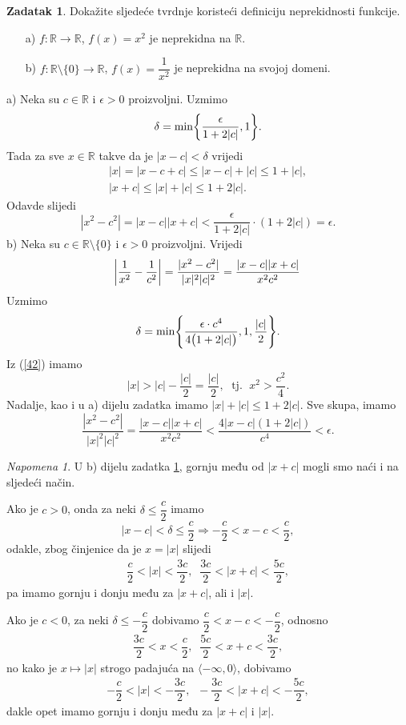 \documentclass{book}
\let\originalleft\left
\let\originalright\right
\renewcommand{\left}{\mathopen{}\mathclose\bgroup\originalleft}
\renewcommand{\right}{\aftergroup\egroup\originalright}
\renewenvironment{proof}{%
    \vspace{-\parskip}\begin{oldproof}%
    }{%
    \end{oldproof}%
}
\theoremstyle{definition}
\theoremstyle{definition}
\newtheorem{exercise}{Zadatak}
\theoremstyle{remark}
\newtheorem{remark}{Napomena}
\begin{document}
\begin{exercise}
\label{cont2}
Dokažite sljedeće tvrdnje koristeći definiciju neprekidnosti funkcije.
\begin{itemize}
\item[a)] $f : \mathbb{R}\to \mathbb{R}$, $f(x)=x^2$ je neprekidna na $\mathbb{R}$.
\item[b)] $f : \mathbb{R}\setminus\{0\}\to \mathbb{R}$, $f(x)=\dfrac{1}{x^2}$ je neprekidna na svojoj domeni.
\end{itemize}
\end{exercise}
\begin{proof}[Rješenje]
a) Neka su $c\in \mathbb{R}$ i $\epsilon>0$ proizvoljni. Uzmimo $$\delta=\min\left\{\dfrac{\epsilon}{1+2|c|}, 1\right\}.$$ 
Tada za sve $x\in \mathbb{R}$ takve da je $|x-c|<\delta$ vrijedi 
\begin{gather*}
|x|=|x-c+c|\leq |x-c|+|c|\leq 1+|c|,\\
|x+c|\leq |x|+|c|\leq 1+2|c|.
\end{gather*}
Odavde slijedi
$$|x^2-c^2|=|x-c||x+c|<\dfrac{\epsilon}{1+2|c|}\cdot(1+2|c|)=\epsilon.$$
b) Neka su $c\in \mathbb{R}\setminus\{0\}$ i $\epsilon>0$ proizvoljni. Vrijedi
$$\abs{\dfrac{1}{x^2}-\dfrac{1}{c^2}}=\dfrac{|x^2-c^2|}{|x|^2|c|^2}=\dfrac{|x-c||x+c|}{x^2c^2}$$
Uzmimo
$$\delta=\min\left\{\dfrac{\epsilon\cdot c^4}{4\left(1+2|c|\right)}, 1, \dfrac{|c|}{2}\right\}.$$
Iz (\ref{42}) imamo $$|x|>|c|-\dfrac{|c|}{2}=\dfrac{|c|}{2},\; \text{ tj. }\; x^2>\dfrac{c^2}{4}.$$
Nadalje, kao i u a) dijelu zadatka imamo $|x|+|c|\leq 1+2|c|$. Sve skupa, imamo
$$\dfrac{|x^2-c^2|}{|x|^2|c|^2}=\dfrac{|x-c||x+c|}{x^2c^2}<\dfrac{4|x-c|(1+2|c|)}{c^4}<\epsilon.$$
\end{proof}
\begin{remark}
U b) dijelu zadatka \ref{cont2}, gornju među od $|x+c|$ mogli smo naći i na sljedeći način.

Ako je $c>0$, onda za neki $\delta\leq \dfrac{c}{2}$ imamo
$$|x-c|< \delta\leq \dfrac{c}{2} \Longrightarrow -\dfrac{c}{2}<x-c<\dfrac{c}{2},$$
odakle, zbog činjenice da je $x=|x|$ slijedi
\begin{gather}
\label{44}
\dfrac{c}{2}<|x|<\dfrac{3c}{2},\;\; \dfrac{3c}{2}<|x+c|<\dfrac{5c}{2},
\end{gather}
pa imamo gornju i donju među za $|x+c|$, ali i $|x|$.

Ako je $c<0$, za neki $\delta\leq -\dfrac{c}{2}$  dobivamo $\dfrac{c}{2}<x-c<-\dfrac{c}{2}$, odnosno 
\begin{gather*}
\dfrac{3c}{2}<x<\dfrac{c}{2},\;\; \dfrac{5c}{2}<x+c<\dfrac{3c}{2},
\end{gather*}
no kako je $x\mapsto |x|$ strogo padajuća na $\langle -\infty, 0\rangle$, dobivamo
\begin{gather*}
-\dfrac{c}{2}<|x|<-\dfrac{3c}{2},\;\; -\dfrac{3c}{2}<|x+c|<-\dfrac{5c}{2},
\end{gather*}
dakle opet imamo gornju i donju među za $|x+c|$ i $|x|$.
\end{remark}
\end{document}
